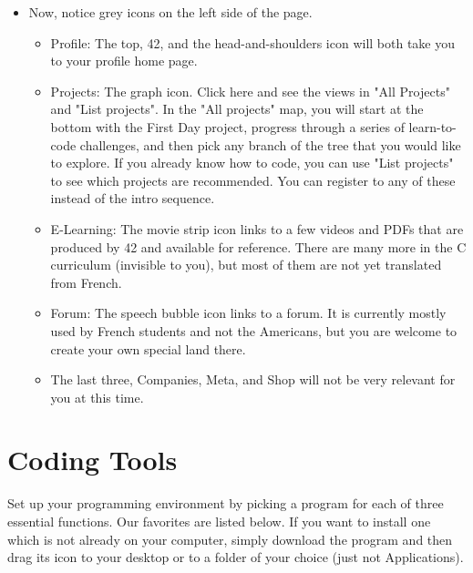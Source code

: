 \documentclass{42-en}
\begin{document}
\begin{itemize}
	\item Now, notice grey icons on the left side of the page.
	\begin{itemize}
		\item Profile: The top, 42, and the head-and-shoulders icon will both take you to your profile home page.
		\item Projects: The graph icon. Click here and see the views in "All Projects" and "List projects". In the "All projects" map, you will start at the bottom with the First Day project, progress through a series of learn-to-code challenges, and then pick any branch of the tree that you would like to explore. If you already know how to code, you can use "List projects" to see which projects are recommended. You can register to any of these instead of the intro sequence.
		\item E-Learning: The movie strip icon links to a few videos and PDFs that are produced by 42 and available for reference. There are many more in the C curriculum (invisible to you), but most of them are not yet translated from French.
		\item Forum: The speech bubble icon links to a forum. It is currently mostly used by French students and not the Americans, but you are welcome to create your own special land there.
		\item The last three, Companies, Meta, and Shop will not be very relevant for you at this time.
	\end{itemize}

\end{itemize}


\chapter{Coding Tools}

Set up your programming environment by picking a program for each of three essential functions. Our favorites are listed below. If you want to install one which is not already on your computer, simply download the program and then drag its icon to your desktop or to a folder of your choice (just not Applications).
\end{document}
